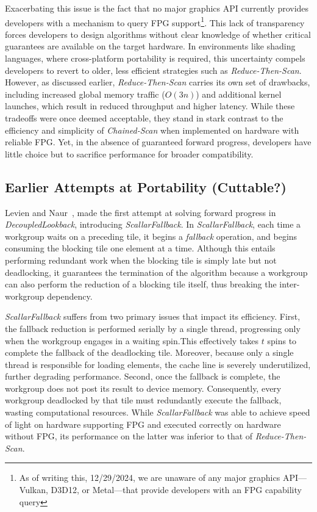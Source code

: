 \documentclass[sigconf]{acmart}
\begin{document}
Exacerbating this issue is the fact that no major graphics API currently provides developers with a mechanism to query FPG support\footnote{As of writing this, 12/29/2024, we are unaware of any major graphics API---Vulkan, D3D12, or Metal---that provide developers with an FPG capability query}. This lack of transparency forces developers to design algorithms without clear knowledge of whether critical guarantees are available on the target hardware. In environments like shading languages, where cross-platform portability is required, this uncertainty compels developers to revert to older, less efficient strategies such as \emph{Reduce-Then-Scan}. However, as discussed earlier, \emph{Reduce-Then-Scan} carries its own set of drawbacks, including increased global memory traffic ($O(3n)$) and additional kernel launches, which result in reduced throughput and higher latency. While these tradeoffs were once deemed acceptable, they stand in stark contrast to the efficiency and simplicity of \emph{Chained-Scan} when implemented on hardware with reliable FPG\@. Yet, in the absence of guaranteed forward progress, developers have little choice but to sacrifice performance for broader compatibility.

\subsection{Earlier Attempts at Portability (Cuttable?)}
Levien and Naur~\cite{}, made the first attempt at solving forward progress in \emph{DecoupledLookback}, introducing \emph{ScallarFallback}. In \emph{ScallarFallback}, each time a workgroup waits on a preceding tile, it begins a \emph{fallback} operation, and begins consuming the blocking tile one element at a time. Although this entails performing redundant work when the blocking tile is simply late but not deadlocking, it guarantees the termination of the algorithm because a workgroup can also perform the reduction of a blocking tile itself, thus breaking the inter-workgroup dependency.

\emph{ScallarFallback} suffers from two primary issues that impact its efficiency. First, the fallback reduction is performed serially by a single thread, progressing only when the workgroup engages in a waiting spin.This effectively takes $t$ spins to complete the fallback of the deadlocking tile. Moreover, because only a single thread is responsible for loading elements, the cache line is severely underutilized, further degrading performance. Second, once the fallback is complete, the workgroup does not post its result to device memory. Consequently, every workgroup deadlocked by that tile must redundantly execute the fallback, wasting computational resources. While \emph{ScallarFallback} was able to achieve speed of light on hardware supporting FPG and executed correctly on hardware without FPG, its performance on the latter was inferior to that of \emph{Reduce-Then-Scan}.
\end{document}
